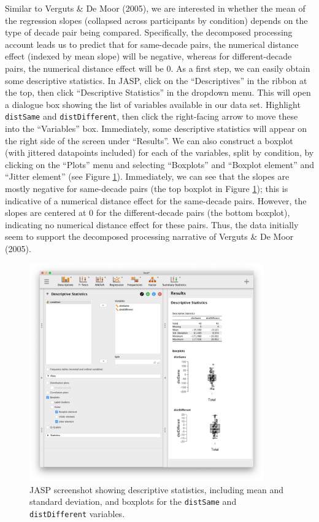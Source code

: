\documentclass[english,,doc,floatsintext]{apa6}
\begin{document}
Similar to Verguts \& De Moor (2005), we are interested in whether the mean of the regression slopes (collapsed across participants by condition) depends on the type of decade pair being compared. Specifically, the decomposed processing account leads us to predict that for same-decade pairs, the numerical distance effect (indexed by mean slope) will be negative, whereas for different-decade pairs, the numerical distance effect will be 0. As a first step, we can easily obtain some descriptive statistics. In JASP, click on the \enquote{Descriptives} in the ribbon at the top, then click \enquote{Descriptive Statistics} in the dropdown menu. This will open a dialogue box showing the list of variables available in our data set. Highlight \texttt{distSame} and \texttt{distDifferent}, then click the right-facing arrow to move these into the \enquote{Variables} box. Immediately, some descriptive statistics will appear on the right side of the screen under \enquote{Results}. We can also construct a boxplot (with jittered datapoints included) for each of the variables, split by condition, by clicking on the \enquote{Plots} menu and selecting \enquote{Boxplots} and \enquote{Boxplot element} and \enquote{Jitter element} (see Figure \ref{fig:ttestDescriptives}). Immediately, we can see that the slopes are mostly negative for same-decade pairs (the top boxplot in Figure \ref{fig:ttestDescriptives}); this is indicative of a numerical distance effect for the same-decade pairs. However, the slopes are centered at 0 for the different-decade pairs (the bottom boxplot), indicating no numerical distance effect for these pairs. Thus, the data initially seem to support the decomposed processing narrative of Verguts \& De Moor (2005).

\begin{figure}
\centering
\includegraphics[width=0.9\textwidth,height=\textheight]{figures/ttestDescriptives.png}
\caption{\label{fig:ttestDescriptives}JASP screenshot showing descriptive statistics, including mean and standard deviation, and boxplots for the \texttt{distSame} and \texttt{distDifferent} variables.}
\end{figure}
\end{document}
